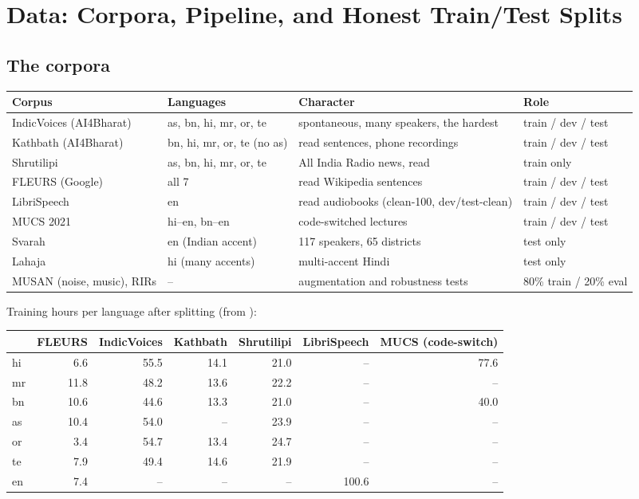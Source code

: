 \chapter{Data: Corpora, Pipeline, and Honest Train/Test Splits}
\label{ch:data}

\section{The corpora}

\begin{center}
\small
\begin{tabularx}{\linewidth}{lYYl}
\toprule
Corpus & Languages & Character & Role\\
\midrule
IndicVoices (AI4Bharat) & as, bn, hi, mr, or, te & spontaneous, many speakers, the hardest & train / dev / test\\
Kathbath (AI4Bharat) & bn, hi, mr, or, te (no as) & read sentences, phone recordings & train / dev / test\\
Shrutilipi & as, bn, hi, mr, or, te & All India Radio news, read & train only\\
FLEURS (Google) & all 7 & read Wikipedia sentences & train / dev / test\\
LibriSpeech & en & read audiobooks (clean-100, dev/test-clean) & train / dev / test\\
MUCS 2021 & hi--en, bn--en & code-switched lectures & train / dev / test\\
Svarah & en (Indian accent) & 117 speakers, 65 districts & test only\\
Lahaja & hi (many accents) & multi-accent Hindi & test only\\
MUSAN (noise, music), RIRs & -- & augmentation and robustness tests & 80\% train / 20\% eval\\
\bottomrule
\end{tabularx}
\end{center}

Training hours per language after splitting (from ):

\begin{center}
\small
\begin{tabular}{lrrrrrr}
\toprule
 & FLEURS & IndicVoices & Kathbath & Shrutilipi & LibriSpeech & MUCS (code-switch)\\
\midrule
hi & 6.6 & 55.5 & 14.1 & 21.0 & -- & 77.6\\
mr & 11.8 & 48.2 & 13.6 & 22.2 & -- & --\\
bn & 10.6 & 44.6 & 13.3 & 21.0 & -- & 40.0\\
as & 10.4 & 54.0 & -- & 23.9 & -- & --\\
or & 3.4 & 54.7 & 13.4 & 24.7 & -- & --\\
te & 7.9 & 49.4 & 14.6 & 21.9 & -- & --\\
en & 7.4 & -- & -- & -- & 100.6 & --\\
\bottomrule
\end{tabular}
\end{center}

